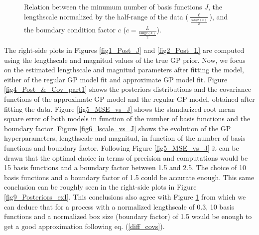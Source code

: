 \documentclass[]{interact}
\theoremstyle{plain}%
\theoremstyle{definition}
\theoremstyle{remark}
\begin{document}
\begin{figure}[H]
\caption{Relation between the minumum number of basis functions $J$, the lengthscale normalized by the half-range of the data ($\frac{\ell}{\frac{\text{range}(x)}{2}}$), and the boundary condition factor $c$ ($c = \frac{L}{\frac{\text{range}(x)}{2}}$).}
  \label{fig3_lscale_vs_J_vs_c_part1}
\end{figure}

The right-side plots in Figures \ref{fig1_Post_J} and \ref{fig2_Post_L} are computed using the lengthscale and magnitud values of the true GP prior. Now, we focus on the estimated lengthscale and magnitud parameters after fitting the model, either of the regular GP model fit and approximate GP model fit. Figure \ref{fig4_Post_&_Cov_part1} shows the posteriors distributions and the covariance functions of the approximate GP model and the regular GP model, obtained after fitting the data. Figure \ref{fig5_MSE_vs_J} shows the standarized root mean square error of both models in function of the number of basis functions and the boundary factor. Figure \ref{fig6_lscale_vs_J} shows the evolution of the GP hyperparameters, lengthscale and magnitud, in function of the number of basis functions and boundary factor. Following Figure \ref{fig5_MSE_vs_J} it can be drawn that the optimal choice in terms of precision and computations would be 15 basis functions and a boundary factor between 1.5 and 2.5. The choice of 10 basis functions and a boundary factor of 1.5 could be accurate enough. This same conclusion can be roughly seen in the right-side plots in Figure \ref{fig9_Posteriors_exI}. This conclusions also agree with Figure \ref{fig3_lscale_vs_J_vs_c_part1} from which we can deduce that for a process with a normalized lengthscale of 0.3, 10 basis functions and a normalized box size (boundary factor) of 1.5 would be enough to get a good approximation following eq. (\ref{diff_covs}). 
\end{document}
